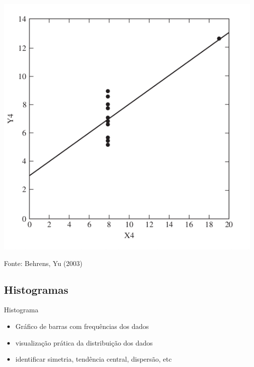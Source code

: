 \documentclass{beamer}
\begin{document}
\begin{frame}
  \begin{center}
    \includegraphics[height=0.7\textheight]{EDA/eda-dispersao4}
  \end{center}
  Fonte: Behrens, Yu (2003)
\end{frame}

\subsection{Histogramas}

\begin{frame}{Histograma}
  \begin{itemize}
  \item Gráfico de barras com frequências dos dados
  \item visualização prática da distribuição dos dados
  \item identificar simetria, tendência central, dispersão, etc
  \end{itemize}
\end{frame}
\end{document}
